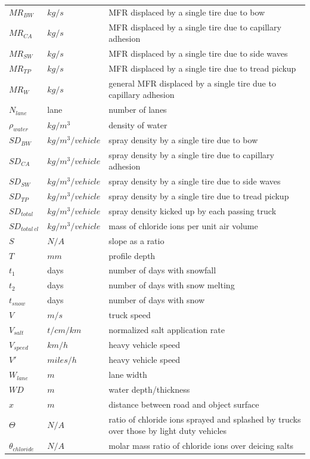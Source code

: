 \documentclass[12pt]{article}
\begin{document}
\begin{longtable*}{l l p{12cm}}
$MR_{BW}$ & $kg/s$ & MFR displaced by a single tire due to bow\\
$MR_{CA}$ & $kg/s$ & MFR displaced by a single tire due to capillary adhesion\\
$MR_{SW}$ & $kg/s$ & MFR displaced by a single tire due to side waves\\
$MR_{TP}$ & $kg/s$ & MFR displaced by a single tire due to tread pickup\\
$MR_{W}$ & $kg/s$ & general MFR displaced by a single tire due to capillary adhesion\\
$N_{lane}$ & lane & number of lanes\\
$\rho_{water}$ & $kg/m^{3}$ & density of water\\
$SD_{BW}$ & $kg/m^{3}/vehicle$ & spray density by a single tire due to bow\\
$SD_{CA}$ & $kg/m^{3}/vehicle$ & spray density by a single tire due to capillary adhesion\\
$SD_{SW}$ & $kg/m^{3}/vehicle$ & spray density by a single tire due to side waves\\
$SD_{TP}$ & $kg/m^{3}/vehicle$ & spray density by a single tire due to tread pickup\\
$SD_{total}$ & $kg/m^{3}/vehicle$ & spray density kicked up by each passing truck\\
$SD_{total~cl}$ & $kg/m^3/vehicle$ & mass of chloride ions per unit air volume\\
$S$ & $N/A$ & slope as a ratio\\
$T$ & $mm$ & profile depth\\
$t_1$ & days & number of days with snowfall\\
$t_2$ & days & number of days with snow melting\\
$t_{snow}$ & days & number of days with snow\\
$V$ & $m/s$ & truck speed\\
$V_{salt}$ & $t/cm/km$ & normalized salt application rate\\
$V_{speed}$ & $km/h$ & heavy vehicle speed\\
$V'$ & $miles/h$ & heavy vehicle speed\\
$W_{lane}$ & $m$ & lane width\\
$WD$ & $m$ & water depth/thickness\\
$x$ & $m$ & distance between road and object surface\\
$\Theta$ & $N/A$ & ratio of chloride ions sprayed and splashed by trucks over those by light duty vehicles\\
$\theta_{chloride}$ & $N/A$ & molar mass ratio of chloride ions over deicing salts\\
\bottomrule
\end{longtable*}
\end{document}
